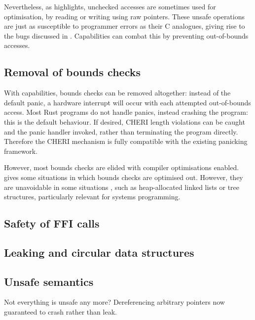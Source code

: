 \documentclass[dissertation.tex]{subfiles}
\begin{document}
Nevertheless, as  highlights, unchecked accesses
are sometimes used for optimisation, by reading or writing using raw
pointers.
These unsafe operations are just as susceptible to programmer errors as
their C analogues, giving rise to the bugs discussed in
.
Capabilities can combat this by preventing out-of-bounds accesses.


\subsection{Removal of bounds checks}
\label{sec:eval-rust-bounds}

With capabilities, bounds checks can be removed altogether: instead of
the default panic, a hardware interrupt will occur with each attempted
out-of-bounds access.
Most Rust programs do not handle panics, instead crashing the program:
this is the default behaviour.
If desired, CHERI length violations can be caught and the panic handler
invoked, rather than terminating the program directly.
Therefore the CHERI mechanism is fully compatible with the existing
panicking framework.

However, most bounds checks are elided with compiler optimisations
enabled.
 gives some situations in which bounds checks are
optimised out.
However, they are unavoidable in some situations , such as
heap-allocated linked lists or tree structures, particularly relevant
for systems programming.




\subsection{Safety of FFI calls}
\label{sec:eval-rust-xprocess}



\subsection{Leaking and circular data structures}


\subsection{Unsafe semantics}
Not everything is unsafe any more? Dereferencing arbitrary pointers now
guaranteed to crash rather than leak.
\end{document}
